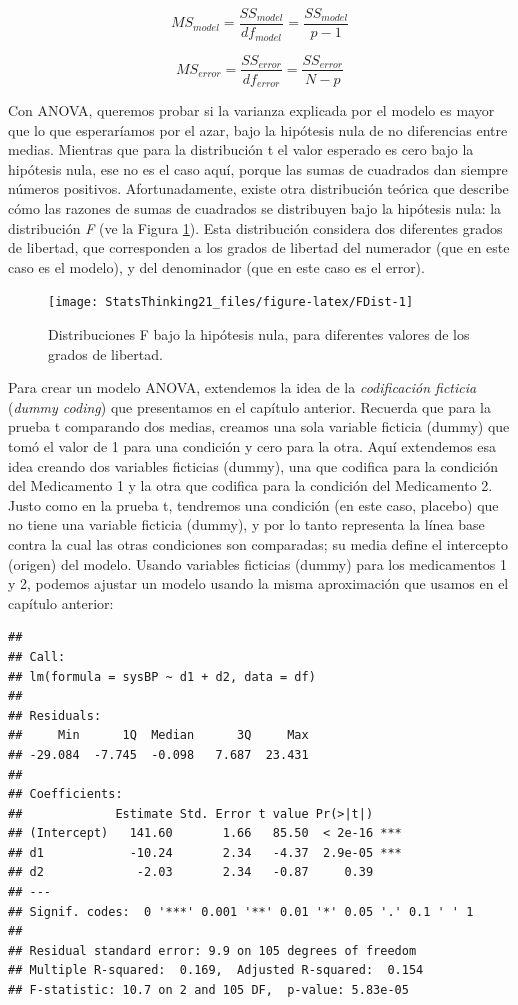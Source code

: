 \documentclass[
  12pt,
]{book}
\theoremstyle{definition}
\theoremstyle{definition}
\theoremstyle{definition}
\theoremstyle{remark}
\begin{document}
\[
MS_{model} =\frac{SS_{model}}{df_{model}}= \frac{SS_{model}}{p-1}
\]

\[
MS_{error} = \frac{SS_{error}}{df_{error}} = \frac{SS_{error}}{N - p}
\]

Con ANOVA, queremos probar si la varianza explicada por el modelo es mayor que lo que esperaríamos por el azar, bajo la hipótesis nula de no diferencias entre medias. Mientras que para la distribución t el valor esperado es cero bajo la hipótesis nula, ese no es el caso aquí, porque las sumas de cuadrados dan siempre números positivos. Afortunadamente, existe otra distribución teórica que describe cómo las razones de sumas de cuadrados se distribuyen bajo la hipótesis nula: la distribución \emph{F} (ve la Figura \ref{fig:FDist}). Esta distribución considera dos diferentes grados de libertad, que corresponden a los grados de libertad del numerador (que en este caso es el modelo), y del denominador (que en este caso es el error).

\begin{figure}
\texttt{[image: StatsThinking21\_files/figure-latex/FDist-1]} \caption{Distribuciones F bajo la hipótesis nula, para diferentes valores de los grados de libertad.}\label{fig:FDist}
\end{figure}

Para crear un modelo ANOVA, extendemos la idea de la \emph{codificación ficticia} (\emph{dummy coding}) que presentamos en el capítulo anterior. Recuerda que para la prueba t comparando dos medias, creamos una sola variable ficticia (dummy) que tomó el valor de 1 para una condición y cero para la otra. Aquí extendemos esa idea creando dos variables ficticias (dummy), una que codifica para la condición del Medicamento 1 y la otra que codifica para la condición del Medicamento 2. Justo como en la prueba t, tendremos una condición (en este caso, placebo) que no tiene una variable ficticia (dummy), y por lo tanto representa la línea base contra la cual las otras condiciones son comparadas; su media define el intercepto (origen) del modelo. Usando variables ficticias (dummy) para los medicamentos 1 y 2, podemos ajustar un modelo usando la misma aproximación que usamos en el capítulo anterior:

\begin{verbatim}
## 
## Call:
## lm(formula = sysBP ~ d1 + d2, data = df)
## 
## Residuals:
##     Min      1Q  Median      3Q     Max 
## -29.084  -7.745  -0.098   7.687  23.431 
## 
## Coefficients:
##             Estimate Std. Error t value Pr(>|t|)    
## (Intercept)   141.60       1.66   85.50  < 2e-16 ***
## d1            -10.24       2.34   -4.37  2.9e-05 ***
## d2             -2.03       2.34   -0.87     0.39    
## ---
## Signif. codes:  0 '***' 0.001 '**' 0.01 '*' 0.05 '.' 0.1 ' ' 1
## 
## Residual standard error: 9.9 on 105 degrees of freedom
## Multiple R-squared:  0.169,	Adjusted R-squared:  0.154 
## F-statistic: 10.7 on 2 and 105 DF,  p-value: 5.83e-05
\end{verbatim}
\end{document}
